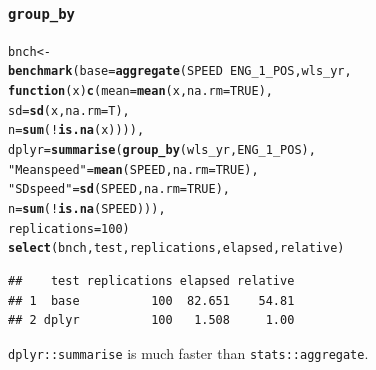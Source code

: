 \documentclass{beamer}\usepackage[]{graphicx}\usepackage[]{color}
\makeatletter
\newcommand{\hlnum}[1]{\textcolor[rgb]{0.686,0.059,0.569}{#1}}%
\newcommand{\hlstr}[1]{\textcolor[rgb]{0.192,0.494,0.8}{#1}}%
\newcommand{\hlopt}[1]{\textcolor[rgb]{0,0,0}{#1}}%
\newcommand{\hlstd}[1]{\textcolor[rgb]{0.345,0.345,0.345}{#1}}%
\newcommand{\hlkwa}[1]{\textcolor[rgb]{0.161,0.373,0.58}{\textbf{#1}}}%
\newcommand{\hlkwb}[1]{\textcolor[rgb]{0.69,0.353,0.396}{#1}}%
\newcommand{\hlkwc}[1]{\textcolor[rgb]{0.333,0.667,0.333}{#1}}%
\newcommand{\hlkwd}[1]{\textcolor[rgb]{0.737,0.353,0.396}{\textbf{#1}}}%
\newenvironment{kframe}{%
 \def\at@end@of@kframe{}%
 \ifinner\ifhmode%
  \def\at@end@of@kframe{\end{minipage}}%
  \begin{minipage}{\columnwidth}%
 \fi\fi%
 \def\FrameCommand##1{\hskip\@totalleftmargin \hskip-\fboxsep
 \colorbox{shadecolor}{##1}\hskip-\fboxsep
     \hskip-\linewidth \hskip-\@totalleftmargin \hskip\columnwidth}%
 \MakeFramed {\advance\hsize-\width
   \@totalleftmargin\z@ \linewidth\hsize
   \@setminipage}}%
 {\par\unskip\endMakeFramed%
 \at@end@of@kframe}
\newenvironment{knitrout}{}{} %
\makeatother
\begin{document}
\begin{frame}[fragile]
  \frametitle{{\tt group\_by}}
\begin{knitrout}\footnotesize
{}\color{fgcolor}\begin{kframe}
\begin{alltt}
\hlstd{bnch} \hlkwb{<-}
  \hlkwd{benchmark}\hlstd{(}\hlkwc{base} \hlstd{=} \hlkwd{aggregate}\hlstd{(SPEED} \hlopt{~} \hlstd{ENG_1_POS, wls_yr,}
                             \hlkwa{function}\hlstd{(}\hlkwc{x}\hlstd{)} \hlkwd{c}\hlstd{(}\hlkwc{mean} \hlstd{=} \hlkwd{mean}\hlstd{(x,} \hlkwc{na.rm} \hlstd{=} \hlnum{TRUE}\hlstd{),}
                                           \hlkwc{sd}   \hlstd{=} \hlkwd{sd}\hlstd{(x,} \hlkwc{na.rm} \hlstd{= T),}
                                           \hlkwc{n}    \hlstd{=} \hlkwd{sum}\hlstd{(}\hlopt{!}\hlkwd{is.na}\hlstd{(x)))),}
            \hlkwc{dplyr} \hlstd{=} \hlkwd{summarise}\hlstd{(}\hlkwd{group_by}\hlstd{(wls_yr, ENG_1_POS),}
                              \hlstr{"Mean speed"} \hlstd{=} \hlkwd{mean}\hlstd{(SPEED,} \hlkwc{na.rm} \hlstd{=} \hlnum{TRUE}\hlstd{),}
                              \hlstr{"SD speed"}   \hlstd{=} \hlkwd{sd}\hlstd{(SPEED,} \hlkwc{na.rm} \hlstd{=} \hlnum{TRUE}\hlstd{),}
                              \hlkwc{n}            \hlstd{=} \hlkwd{sum}\hlstd{(}\hlopt{!}\hlkwd{is.na}\hlstd{(SPEED))),}
            \hlkwc{replications} \hlstd{=} \hlnum{100}\hlstd{)}
\hlkwd{select}\hlstd{(bnch, test, replications, elapsed, relative)}
\end{alltt}
\begin{verbatim}
##    test replications elapsed relative
## 1  base          100  82.651    54.81
## 2 dplyr          100   1.508     1.00
\end{verbatim}
\end{kframe}
\end{knitrout}
  {\tt dplyr::summarise} is much faster than {\tt stats::aggregate}.
\end{frame} 
\end{document}
